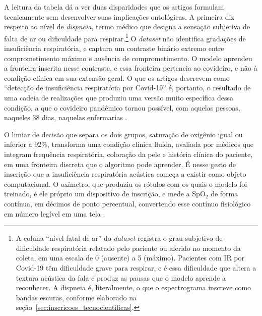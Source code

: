 A leitura da tabela dá a ver duas disparidades que os artigos formulam tecnicamente sem desenvolver suas implicações ontológicas. A primeira diz respeito ao nível de \textit{dispneia}, termo médico que designa a sensação subjetiva de falta de ar ou dificuldade para respirar.\footnote{A coluna \enquote{nível fatal de ar} do \textit{dataset} registra o grau subjetivo de dificuldade respiratória relatado pelo paciente ou aferido no momento da coleta, em uma escala de 0 (ausente) a 5 (máximo). Pacientes com IR por Covid-19 têm dificuldade grave para respirar, e é essa dificuldade que altera a textura acústica da fala e produz as pausas que o modelo aprende a reconhecer. A dispneia é, literalmente, o que o espectrograma inscreve como bandas escuras, conforme elaborado na seção~\ref{sec:inscricoes_tecnocientificas}.} O \textit{dataset} não identifica gradações de insuficiência respiratória, e captura um contraste binário extremo entre comprometimento máximo e ausência de comprometimento. O modelo aprendeu a fronteira inscrita nesse contraste, e essa fronteira pertencia ao covideiro, e não à condição clínica em sua extensão geral. O que os artigos descrevem como \enquote{detecção de insuficiência respiratória por Covid-19} é, portanto, o resultado de uma cadeia de realizações que produziu uma versão muito específica dessa condição, a que o covideiro pandêmico tornou possível, com aquelas pessoas, naqueles 38 dias, naquelas enfermarias \parencite{Gauy2024Discriminant}.

O limiar de decisão que separa os dois grupos, saturação de oxigênio igual ou inferior a 92\%, transforma uma condição clínica fluida, avaliada por médicos que integram frequência respiratória, coloração da pele e história clínica do paciente, em uma fronteira discreta que o algoritmo pode aprender. É nesse gesto de inscrição que a insuficiência respiratória acústica começa a existir como objeto computacional. O oxímetro, que produziu os rótulos com os quais o modelo foi treinado, é ele próprio um dispositivo de inscrição, e mede a SpO$_2$ de forma contínua, em décimos de ponto percentual, convertendo esse contínuo fisiológico em número legível em uma tela \parencite{Gauy2024Discriminant}.

